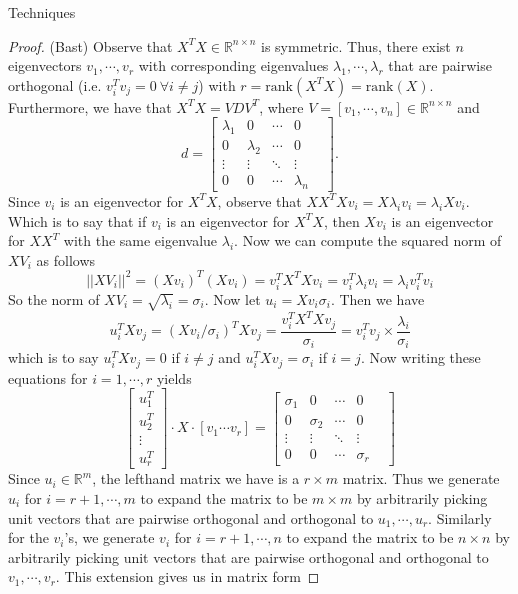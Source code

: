 \documentclass[12pt]{pom_thesis}
\begin{document}
\begin{chapter}{Techniques}
\begin{proof}(Bast) Observe that $X^TX \in \mathbb{R}^{n \times n}$ is symmetric. Thus, there exist $n$ eigenvectors $v_1,\cdots,v_r$ with corresponding eigenvalues $\lambda_1,\cdots,\lambda_r$ that are pairwise orthogonal (i.e. $v^T_iv_j=0 \ \forall i \neq j$) with $r = \text{rank}(X^TX) = \text{rank}(X)$. Furthermore, we have that $X^TX = VDV^T$, where $V=[v_1,\cdots,v_n] \in \mathbb{R}^{n\times n}$ and  $$d = \begin{bmatrix}
	\lambda_1  & 0     & \cdots             & 0    \\
	0  & \lambda_2 & \cdots & 0        \\
	\vdots  & \vdots & \ddots & \vdots &     \\
	0 & 0 & \cdots & \lambda_n
	\end{bmatrix}.$$ 
	Since $v_i$ is an eigenvector for $X^TX$, observe that $XX^TXv_i = X\lambda_iv_i=\lambda_iXv_i$. Which is to say that if  $v_i$ is an eigenvector for $X^TX$, then  $Xv_i$ is an eigenvector for $XX^T$ with the same eigenvalue $\lambda_i$. Now we can compute the squared norm of $XV_i$ as follows
	$$||XV_i||^2 = (Xv_i)^T(Xv_i)=v_i^TX^TXv_i = v_i^T\lambda_i v_i = \lambda_i v_i^T v_i$$
	So the norm of $XV_i = \sqrt{\lambda_i} = \sigma_i.$ Now let $u_i=Xv_i\sigma_i$. Then we have 
	$$u_i^TXv_j = (Xv_i/\sigma_i)^TXv_j = \frac{v_i^TX^TXv_j}{\sigma_i} = v_i^Tv_j \times \frac{\lambda_i}{\sigma_i}$$
	which is to say $u_i^TXv_j=0$ if $i\neq j$ and $u_i^TXv_j=\sigma_i$ if $i=j$. Now writing these equations for $i=1,\cdots,r$ yields
	 $$\begin{bmatrix}
	 u_1^T \\
	 u_2^T        \\
	 \vdots      \\
	 u_r^T 
	 \end{bmatrix} \cdot X \cdot [v_1 \cdots v_r] =  \begin{bmatrix}
	 \sigma_1  & 0     & \cdots             & 0    \\
	 0  & \sigma_2 & \cdots & 0        \\
	 \vdots  & \vdots & \ddots & \vdots &     \\
	 0 & 0 & \cdots & \sigma_r
	 \end{bmatrix}$$
	 Since $u_i \in \mathbb{R}^m$, the lefthand matrix we have is a $r \times m$ matrix. Thus we generate $u_i$ for $i=r+1,\cdots,m$ to expand the matrix to be $m \times m$ by arbitrarily picking unit vectors that are pairwise orthogonal and orthogonal to $u_1,\cdots,u_r$. Similarly for the $v_i$'s, we generate $v_i$ for $i=r+1,\cdots,n$ to expand the matrix to be $n \times n$ by arbitrarily picking unit vectors that are pairwise orthogonal and orthogonal to $v_1,\cdots,v_r$. This extension gives us in matrix form

\end{proof}
\end{chapter}
\end{document}
